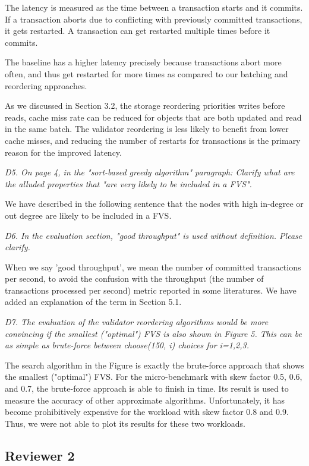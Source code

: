 \documentclass{article}
\begin{document}
The latency is measured as the time between a transaction starts and it commits. If a transaction aborts due to conflicting with previously committed transactions, it gets restarted. A transaction can get restarted multiple times before it commits. 

The baseline has a higher latency precisely because transactions abort more often, and thus get restarted for more times as compared to our batching and reordering approaches. 

As we discussed in Section 3.2, the storage reordering priorities writes before reads, cache miss rate can be reduced for objects that are both updated and read in the same batch. The validator reordering is less likely to benefit from lower cache misses, and reducing the number of restarts for transactions is the primary reason for the improved latency.

\emph{D5. On page 4, in the "sort-based greedy algorithm" paragraph: Clarify what are the alluded properties that "are very likely to be included in a FVS".}

We have described in the following sentence that the nodes with high in-degree or out degree are likely to be included in a FVS.

\emph{D6. In the evaluation section, "good throughput" is used without definition. Please clarify.}

When we say 'good throughput', we mean the number of committed transactions per second, to avoid the confusion with the throughput (the number of transactions processed per second) metric reported in some literatures. We have added an explanation of the term in Section 5.1.  

\emph{D7. The evaluation of the validator reordering algorithms would be more convincing if the smallest ("optimal") FVS is also shown in Figure 5. This can be as simple as brute-force between choose(150, i) choices for i=1,2,3.}

The search algorithm in the Figure is exactly the brute-force approach that shows the smallest ("optimal") FVS. For the micro-benchmark with skew factor 0.5, 0.6, and 0.7, the brute-force approach is able to finish in time. Its result is used to measure the accuracy of other approximate algorithms. Unfortunately, it has become prohibitively expensive for the workload with skew factor 0.8 and 0.9. Thus, we were not able to plot its results for these two workloads.

\subsection{Reviewer 2}
\end{document}
